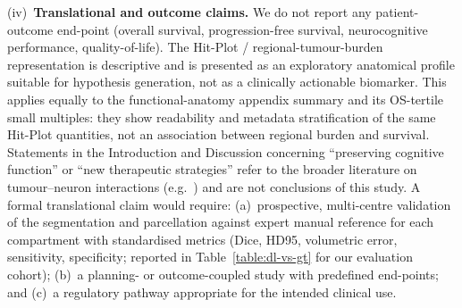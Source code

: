 \documentclass[a4paper,11pt,leqno]{article}
\begin{document}
(iv)~\textbf{Translational and outcome claims.} We do not report any patient-outcome end-point (overall
survival, progression-free survival, neurocognitive performance,
quality-of-life). The Hit-Plot / regional-tumour-burden representation
is descriptive and is presented as an exploratory anatomical profile
suitable for hypothesis generation, not as a clinically actionable
biomarker. This applies equally to the functional-anatomy appendix
summary and its OS-tertile small multiples: they show readability and
metadata stratification of the same Hit-Plot quantities, not an
association between regional burden and survival. Statements in the
Introduction and Discussion concerning
``preserving cognitive function'' or ``new therapeutic strategies'' refer
to the broader literature on tumour--neuron interactions
(e.g.~\cite{Krishna2023, Ibrahim2023}) and are not conclusions of this
study. A formal translational claim would require: (a)~prospective,
multi-centre validation of the segmentation and parcellation against
expert manual reference for each compartment with standardised metrics
(Dice, HD95, volumetric error, sensitivity, specificity; reported in Table~\ref{table:dl-vs-gt} for our evaluation cohort); (b)~a planning- or
outcome-coupled study with predefined end-points; and (c)~a regulatory
pathway appropriate for the intended clinical use.
\end{document}
